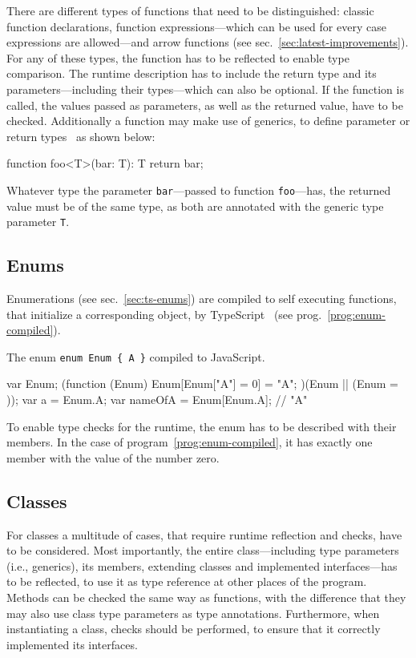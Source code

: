 There are different types of functions that need to be distinguished: classic function declarations, function expressions---which can be used for every case expressions are allowed---and arrow functions (see sec.~\ref{sec:latest-improvements}). For any of these types, the function has to be reflected to enable type comparison. The runtime description has to include the return type and its parameters---including their types---which can also be optional. If the function is called, the values passed as parameters, as well as the returned value, have to be checked. Additionally a function may make use of generics, to define parameter or return types~\cite{TypeScriptHandbook:Generics} as shown below:
\begin{JsCode}[numbers=none]
function foo<T>(bar: T): T {
  return bar;
} 
\end{JsCode}
Whatever type the parameter \texttt{bar}---passed to function \texttt{foo}---has, the returned value must be of the same type, as both are annotated with the generic type parameter \texttt{T}.

\subsection{Enums}

Enumerations (see sec.~\ref{sec:ts-enums}) are compiled to self executing functions, that initialize a corresponding object, by TypeScript~\cite{TypeScriptHandbook:Enums} (see prog.~\ref{prog:enum-compiled}).
\begin{program}
\caption{The enum \texttt{enum Enum \{ A \}} compiled to JavaScript.~\cite{TypeScriptHandbook:Enums}}
\label{prog:enum-compiled}
\begin{JsCode}
var Enum;
(function (Enum) {
    Enum[Enum["A"] = 0] = "A";
})(Enum || (Enum = {}));
var a = Enum.A;
var nameOfA = Enum[Enum.A]; // "A"
\end{JsCode}
\end{program}
To enable type checks for the runtime, the enum has to be described with their members. In the case of program~\ref{prog:enum-compiled}, it has exactly one member with the value of the number zero.

\subsection{Classes}

For classes a multitude of cases, that require runtime reflection and checks, have to be considered. Most importantly, the entire class---including type parameters (i.e., generics), its members, extending classes and implemented interfaces---has to be reflected, to use it as type reference at other places of the program. Methods can be checked the same way as functions, with the difference that they may also use class type parameters as type annotations. Furthermore, when instantiating a class, checks should be performed, to ensure that it correctly implemented its interfaces.

